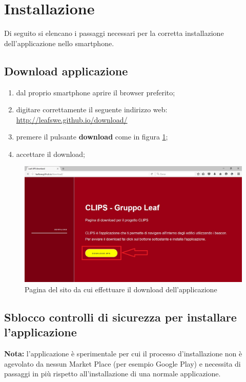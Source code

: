\documentclass[../ClipsManualeUtente.tex]{subfiles}
\begin{document}
\section{Installazione}
	Di seguito si elencano i passaggi necessari per la corretta installazione dell'applicazione nello smartphone.
	

		\subsection{Download applicazione}
			\begin{enumerate}
				\item dal proprio smartphone aprire il browser preferito;
				\item digitare correttamente il seguente indirizzo web: \\
					\url{http://leafswe.github.io/download/}
				\item premere il pulsante \textbf{download} come in figura \ref{fig:DownloadApplicazioneSito};
				\item accettare il download;
			\end{enumerate}
			
			\begin{figure} [h]
				\centering
				\includegraphics[width=\textwidth]{img/DownloadApplicazioneSito}
				\caption{Pagina del sito da cui effettuare il download dell'applicazione}
				\label{fig:DownloadApplicazioneSito}
			\end{figure}
		
		\newpage
		\subsection{Sblocco controlli di sicurezza per installare l'applicazione}
		
			\begin{framed}
				\textbf{Nota:} l'applicazione è sperimentale per cui il processo d'installazione non è agevolato da nessun Market Place (per esempio Google Play) e necessita di passaggi in più rispetto all'installazione di una normale applicazione.
			\end{framed}
		
\end{document}
